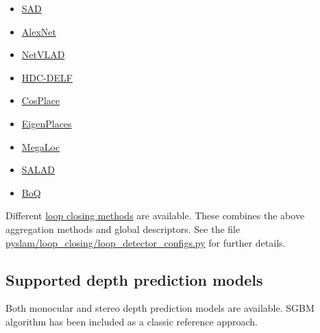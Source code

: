 \documentclass{article}
\providecommand{\tightlist}{%
  \setlength{\itemsep}{0pt}\setlength{\parskip}{0pt}}
\begin{document}
\begin{itemize}
\tightlist
\item
  \href{https://ieeexplore.ieee.org/document/6224623}{SAD} \cite{milford2012seqslam}
\item
  \href{https://github.com/BVLC/caffe/tree/master/models/bvlc_alexnet}{AlexNet} \cite{krizhevsky2012imagenet}
\item
  \href{https://www.di.ens.fr/willow/research/netvlad/}{NetVLAD} \cite{arandjelovic2016netvlad}
\item
  \href{https://www.tu-chemnitz.de/etit/proaut/hdc_desc}{HDC-DELF} \cite{schlegel2022comparison}
\item
  \href{https://github.com/gmberton/CosPlace}{CosPlace} \cite{berton2023cosplace}
\item
  \href{https://github.com/gmberton/EigenPlaces}{EigenPlaces} \cite{berton2023eigenplaces}
\item
  \href{https://github.com/gmberton/MegaLoc}{MegaLoc} \cite{berton2025megaloc}
\item
  \href{https://github.com/serizba/salad}{SALAD} \cite{izquierdo2024salad}
\item
  \href{https://github.com/amaralibey/Bag-of-Queries}{BoQ} \cite{alibey2024boq}
\end{itemize}

Different \protect\hyperlink{loop-closing}{loop closing methods} are
available. These combines the above aggregation methods and global
descriptors. See the file \href{https://github.com/luigifreda/pyslam/blob/master/pyslam/loop_closing/loop_detector_configs.py}{pyslam/loop\_closing/loop\_detector\_configs.py}
for further details.

\hypertarget{supported-depth-prediction-models}{%
\subsection{Supported depth prediction
models}\label{supported-depth-prediction-models}}

Both monocular and stereo depth prediction models are available. SGBM
algorithm has been included as a classic reference approach.
\end{document}
